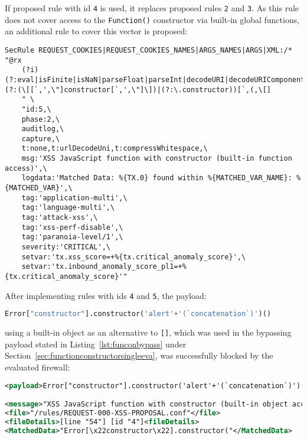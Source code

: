 If proposed rule with id \verb|4| is used, it replaces proposed rules \verb|2| and \verb|3|. As this rule does not cover access to the \verb|Function()| constructor via built-in global functions, an additional rule to cover this vector is proposed:

\begin{lstlisting}[style=basicStyle, caption=Rule proposal to block usage of Function() constructor via built-in functions]
SecRule REQUEST_COOKIES|REQUEST_COOKIES_NAMES|ARGS_NAMES|ARGS|XML:/* "@rx 
    (?i)(?:eval|isFinite|isNaN|parseFloat|parseInt|decodeURI|decodeURIComponent|encodeURI|encodeURIComponent|escape|unescape)(?:(\[[`,',\"]constructor[`,',\"]\])|(?:\.constructor))[`,(,\[]
    " \
    "id:5,\
    phase:2,\
    auditlog,\
    capture,\
    t:none,t:urlDecodeUni,t:compressWhitespace,\
    msg:'XSS JavaScript function with constructor (built-in function access)',\
    logdata:'Matched Data: %{TX.0} found within %{MATCHED_VAR_NAME}: %{MATCHED_VAR}',\
    tag:'application-multi',\
    tag:'language-multi',\
    tag:'attack-xss',\
    tag:'xss-perf-disable',\
    tag:'paranoia-level/1',\
    severity:'CRITICAL',\
    setvar:'tx.xss_score=+%{tx.critical_anomaly_score}',\
    setvar:'tx.inbound_anomaly_score_pl1=+%{tx.critical_anomaly_score}'"
\end{lstlisting}

After implementing rules with ids \verb|4| and \verb|5|, the payload:

\begin{lstlisting}[style=basicStyle, language=Python]
Error["constructor"].constructor('alert'+'(`concatenation`)')()
\end{lstlisting}

using a built-in object as an alternative to \verb|[]|, which was used in the bypassing payload stated in Listing~\ref{lst:funconbypass} under Section~\ref{sec:functionconstructorsingleeva}, was successfully blocked by the evaluated firewall:

\begin{lstlisting}[style=ruleStyle, language=XML, caption=Function() constructor bypass using a built-in object blocked, label={lst:constructorsblockedbio}]
<payload>Error["constructor"].constructor('alert'+'(`concatenation`)')()</payload>

<message>"XSS JavaScript function with constructor (built-in object access)"</message>
<file>"/rules/REQUEST-000-XSS-PROPOSAL.conf"</file>
<fileDetails>[line "54"] [id "4"]<fileDetails>
<MatchedData>"Error[\x22constructor\x22].constructor("</MatchedData>
\end{lstlisting}


